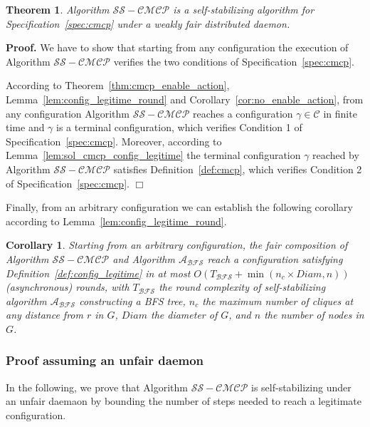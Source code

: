\documentclass[11pt,letterpaper,onecolumn]{article}
\newtheorem{theorem}{Theorem}
\newtheorem{corollary}{Corollary}
\newenvironment{proof}{\noindent \begin{rm}{\textbf{Proof.} }}{\hspace*{\fill}$\Box$\par\end{rm} \vspace{.3cm}}
\begin{document}
\begin{theorem}
Algorithm $\mathcal{SS-CMCP}$ is a self-stabilizing algorithm for Specification~\ref{spec:cmcp} under a weakly fair distributed daemon.
\end{theorem}

\begin{proof}
We have to show that starting from any configuration the execution of Algorithm $\mathcal{SS-CMCP}$ verifies the two conditions of Specification~\ref{spec:cmcp}.

According to Theorem~\ref{thm:cmcp_enable_action}, Lemma~\ref{lem:config_legitime_round} and Corollary~\ref{cor:no_enable_action}, from any configuration Algorithm $\mathcal{SS-CMCP}$ reaches a configuration $\gamma \in \mathcal{C}$ in finite time and $\gamma$ is a terminal configuration, which verifies Condition 1 of Specification~\ref{spec:cmcp}. Moreover, according to Lemma~\ref{lem:sol_cmcp_config_legitime} the terminal configuration $\gamma$ reached by Algorithm $\mathcal{SS-CMCP}$ satisfies Definition~\ref{def:cmcp}, which verifies Condition 2 of Specification~\ref{spec:cmcp}.
\end{proof}

Finally, from an arbitrary configuration we can establish the following corollary according to Lemma~\ref{lem:config_legitime_round}.

\begin{corollary}
\label{cor:config_legitime_round_avec_BFS}
Starting from an arbitrary configuration, the fair composition of Algorithm $\mathcal{SS-CMCP}$ and Algorithm $\mathcal{A_{BFS}}$ reach a configuration satisfying Definition~\ref{def:config_legitime} in at most $O(T_{\mathcal{BFS}}+\min(n_c \times Diam, n))$ (asynchronous) rounds, with $T_{\mathcal{BFS}}$ the round complexity of self-stabilizing algorithm $\mathcal{A_{BFS}}$ constructing a BFS tree, $n_c$ the maximum number of cliques at any distance from $r$ in $G$, $Diam$ the diameter of $G$, and $n$ the number of nodes in $G$.
\end{corollary}

\subsubsection{Proof assuming an unfair daemon}

In the following, we prove that Algorithm $\mathcal{SS-CMCP}$ is self-stabilizing under an unfair daemaon by bounding the number of steps needed to reach a legitimate configuration.
\end{document}
